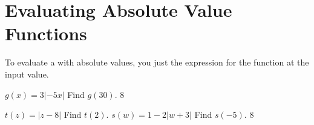 \section{Evaluating Absolute Value Functions}

\begin{tcolorbox}[center,width=6.5in,colback=white,]
    To evaluate a  with absolute values, 
    you just  the expression for the function 
    at the input value.
\end{tcolorbox}


{
    $
        g(x) =
        3|-5x|
    $
    \qquad
    Find $g(30)$.
}
{8\onelineskip}

\myProblems
{
    $
        t(z) =
        |z - 8|
    $
    \qquad
    Find $t(2)$.
}
{
    $
        s(w) =
        1 - 2\left|w + 3\right|
    $
    \qquad
    Find $s(-5)$.
}
{8\onelineskip}

